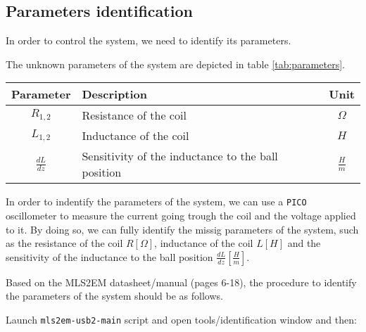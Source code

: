 \subsection{Parameters identification}
\label{subsec:parameters_identification}

In order to control the system, we need to identify its parameters.

The unknown parameters of the system are depicted in table \ref{tab:parameters}.

\begin{table}[H]
    \centering
    \begin{tabular}{|c|l|c|}
        \hline
        Parameter         & Description                                        & Unit          \\
        \hline
        $R_{1, 2}$        & Resistance of the coil                             & $\Omega$      \\
        $L_{1, 2}$        & Inductance of the coil                             & $H$           \\
        $\frac{d L}{d z}$ & Sensitivity of the inductance to the ball position & $\frac{H}{m}$ \\
        \hline
    \end{tabular}
\end{table}

In order to indentify the parameters of the system, we can use a \texttt{PICO} oscillometer to measure the current going trough the coil and the voltage applied to it.
By doing so, we can fully identify the missig parameters of the system, such as the resistance of the coil $R [\Omega]$, inductance of the coil $L [H]$ and the sensitivity of the inductance to the ball position $\frac{d L}{d z} [\frac{H}{m}]$.







Based on the MLS2EM datasheet/manual (pages 6-18), the procedure to identify the parameters of the system should be as follows.

Launch \texttt{mls2em-usb2-main} script and open tools/identification window and then:

